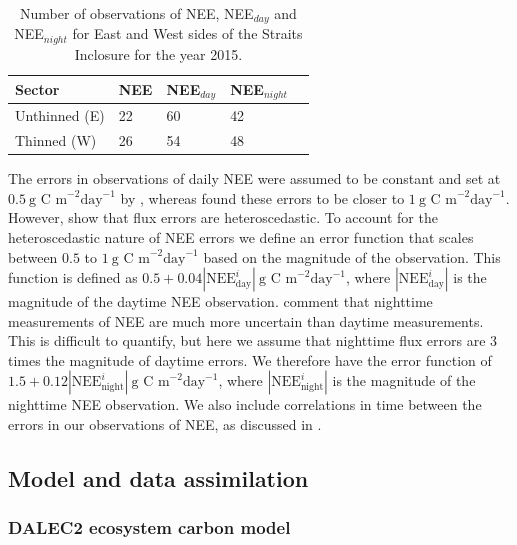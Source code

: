 \begin{table}[ht] 
	\caption{Number of observations of NEE, NEE\(_{day}\) and NEE\(_{night}\) for East and West sides of the Straits Inclosure for the year 2015.}
\begin{center}
	\begin{tabular}{| l | l | l | l | l |}
	\hline
	Sector & NEE & NEE\(_{day}\) & NEE\(_{night}\)  \\ \hline
	Unthinned (E) & 22 & 60 & 42 \\ \hline
	Thinned (W) & 26 & 54 & 48 \\ \hline
	\end{tabular}
	\label{chap7:table:nee_obs}
\end{center} 
\end{table}

The errors in observations of daily NEE were assumed to be constant and set at $0.5~\text{g C m}^{-2} \text{day}^{-1}$ by \citet{williams2005improved}, whereas \citet{braswell2005estimating} found these errors to be closer to $1~\text{g C m}^{-2} \text{day}^{-1}$. However, \citet{Richardson200838} show that flux errors are heteroscedastic. To account for the heteroscedastic nature of NEE errors we define an error function that scales between $0.5$ to $1~\text{g C m}^{-2} \text{day}^{-1}$ based on the magnitude of the observation. This function is defined as $0.5 + 0.04|\text{NEE}_{\text{day}}^{i}|~\text{g C m}^{-2} \text{day}^{-1}$, where \(|\text{NEE}_{\text{day}}^{i}|\) is the magnitude of the daytime NEE observation. \citet{raupach2005model} comment that nighttime measurements of NEE are much more uncertain than daytime measurements. This is difficult to quantify, but here we assume that nighttime flux errors are 3 times the magnitude of daytime errors. We therefore have the error function of $1.5 + 0.12|\text{NEE}_{\text{night}}^{i}|~\text{g C m}^{-2} \text{day}^{-1}$, where \(|\text{NEE}_{\text{night}}^{i}|\) is the magnitude of the nighttime NEE observation. We also include correlations in time between the errors in our observations of NEE, as discussed in \citet{Pinnington2016299}.

\subsection{Model and data assimilation}
\subsubsection{DALEC2 ecosystem carbon model} \label{chap7:sec:dalec2}

